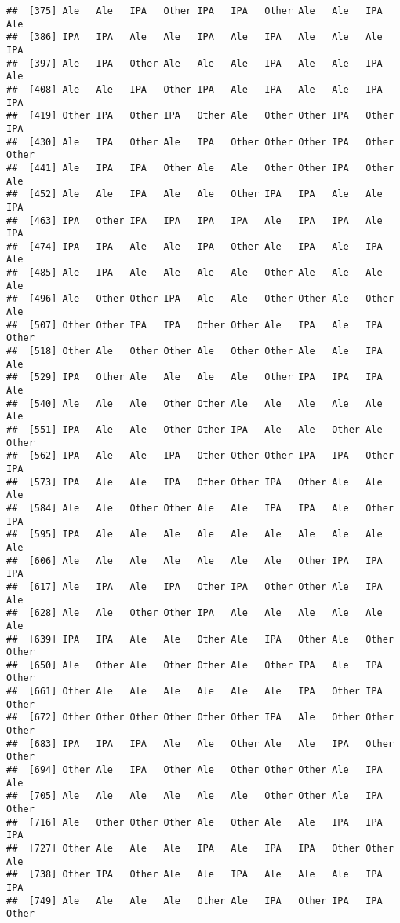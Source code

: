 \documentclass[]{article}
\begin{document}
\begin{verbatim}
##  [375] Ale   Ale   IPA   Other IPA   IPA   Other Ale   Ale   IPA   Ale  
##  [386] IPA   IPA   Ale   Ale   IPA   Ale   IPA   Ale   Ale   Ale   IPA  
##  [397] Ale   IPA   Other Ale   Ale   Ale   IPA   Ale   Ale   IPA   Ale  
##  [408] Ale   Ale   IPA   Other IPA   Ale   IPA   Ale   Ale   IPA   IPA  
##  [419] Other IPA   Other IPA   Other Ale   Other Other IPA   Other IPA  
##  [430] Ale   IPA   Other Ale   IPA   Other Other Other IPA   Other Other
##  [441] Ale   IPA   IPA   Other Ale   Ale   Other Other IPA   Other Ale  
##  [452] Ale   Ale   IPA   Ale   Ale   Other IPA   IPA   Ale   Ale   IPA  
##  [463] IPA   Other IPA   IPA   IPA   IPA   Ale   IPA   IPA   Ale   IPA  
##  [474] IPA   IPA   Ale   Ale   IPA   Other Ale   IPA   Ale   IPA   Ale  
##  [485] Ale   IPA   Ale   Ale   Ale   Ale   Other Ale   Ale   Ale   Ale  
##  [496] Ale   Other Other IPA   Ale   Ale   Other Other Ale   Other Ale  
##  [507] Other Other IPA   IPA   Other Other Ale   IPA   Ale   IPA   Other
##  [518] Other Ale   Other Other Ale   Other Other Ale   Ale   IPA   Ale  
##  [529] IPA   Other Ale   Ale   Ale   Ale   Other IPA   IPA   IPA   Ale  
##  [540] Ale   Ale   Ale   Other Other Ale   Ale   Ale   Ale   Ale   Ale  
##  [551] IPA   Ale   Ale   Other Other IPA   Ale   Ale   Other Ale   Other
##  [562] IPA   Ale   Ale   IPA   Other Other Other IPA   IPA   Other IPA  
##  [573] IPA   Ale   Ale   IPA   Other Other IPA   Other Ale   Ale   Ale  
##  [584] Ale   Ale   Other Other Ale   Ale   IPA   IPA   Ale   Other IPA  
##  [595] IPA   Ale   Ale   Ale   Ale   Ale   Ale   Ale   Ale   Ale   Ale  
##  [606] Ale   Ale   Ale   Ale   Ale   Ale   Ale   Other IPA   IPA   IPA  
##  [617] Ale   IPA   Ale   IPA   Other IPA   Other Other Ale   IPA   Ale  
##  [628] Ale   Ale   Other Other IPA   Ale   Ale   Ale   Ale   Ale   Ale  
##  [639] IPA   IPA   Ale   Ale   Other Ale   IPA   Other Ale   Other Other
##  [650] Ale   Other Ale   Other Other Ale   Other IPA   Ale   IPA   Other
##  [661] Other Ale   Ale   Ale   Ale   Ale   Ale   IPA   Other IPA   Other
##  [672] Other Other Other Other Other Other IPA   Ale   Other Other Other
##  [683] IPA   IPA   IPA   Ale   Ale   Other Ale   Ale   IPA   Other Other
##  [694] Other Ale   IPA   Other Ale   Other Other Other Ale   IPA   Ale  
##  [705] Ale   Ale   Ale   Ale   Ale   Ale   Other Other Ale   IPA   Other
##  [716] Ale   Other Other Other Ale   Other Ale   Ale   IPA   IPA   IPA  
##  [727] Other Ale   Ale   Ale   IPA   Ale   IPA   IPA   Other Other Ale  
##  [738] Other IPA   Other Ale   Ale   IPA   Ale   Ale   Ale   IPA   IPA  
##  [749] Ale   Ale   Ale   Ale   Other Ale   IPA   Other IPA   IPA   Other

\end{verbatim}
\end{document}
